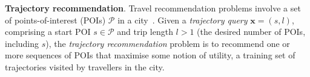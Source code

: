 


\textbf{Trajectory recommendation}.
Travel recommendation problems involve a set of points-of-interest (POIs) $\mathcal{P}$ in a city~\cite{bao2015recommendations,zheng2015trajectory,zheng2014urban}.
Given a \emph{trajectory query} $\mathbf{x} = (s, l)$,
comprising a start POI $s \in \mathcal{P}$ and trip length
$l \!>\! 1$ (\ie the desired number of POIs, including $s$),
the \emph{trajectory recommendation} problem is to
recommend one or more sequences of POIs %
that maximise some notion of utility, 
 a training set
of trajectories visited by travellers in the city.

